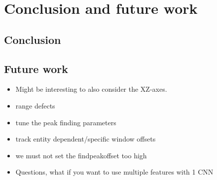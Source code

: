 \chapter{Conclusion and future work}

\section{Conclusion}

\section{Future work}

\begin{itemize}
	\item Might be interesting to also consider the XZ-axes.
	\item range defects
	\item tune the peak finding parameters
	\item track entity dependent/specific window offsets
	\item we must not set the findpeakoffset too high
	\item Questions, what if you want to use multiple features with 1 CNN
	
	
\end{itemize}

\newpage
